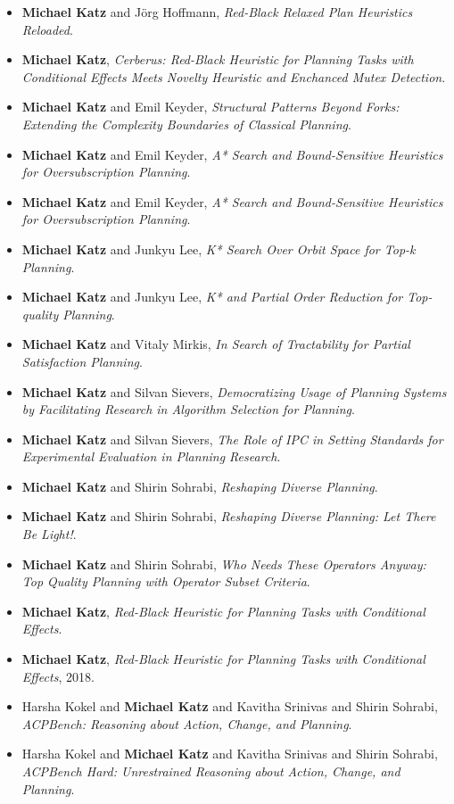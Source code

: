 \begin{itemize}[noitemsep]
\item {\bf Michael Katz} and Jörg Hoffmann, {\it Red-Black Relaxed Plan Heuristics Reloaded}.
\item {\bf Michael Katz}, {\it Cerberus: Red-Black Heuristic for Planning Tasks with Conditional Effects Meets Novelty Heuristic and Enchanced Mutex Detection}.
\item {\bf Michael Katz} and Emil Keyder, {\it Structural Patterns Beyond Forks: Extending the Complexity Boundaries of Classical Planning}.
\item {\bf Michael Katz} and Emil Keyder, {\it A* Search and Bound-Sensitive Heuristics for Oversubscription Planning}.
\item {\bf Michael Katz} and Emil Keyder, {\it A* Search and Bound-Sensitive Heuristics for Oversubscription Planning}.
\item {\bf Michael Katz} and Junkyu Lee, {\it K* Search Over Orbit Space for Top-k Planning}.
\item {\bf Michael Katz} and Junkyu Lee, {\it K* and Partial Order Reduction for Top-quality Planning}.
\item {\bf Michael Katz} and Vitaly Mirkis, {\it In Search of Tractability for Partial Satisfaction Planning}.
\item {\bf Michael Katz} and Silvan Sievers, {\it Democratizing Usage of Planning Systems by Facilitating Research in Algorithm Selection for Planning}.
\item {\bf Michael Katz} and Silvan Sievers, {\it The Role of IPC in Setting Standards for Experimental Evaluation in Planning Research}.
\item {\bf Michael Katz} and Shirin Sohrabi, {\it Reshaping Diverse Planning}.
\item {\bf Michael Katz} and Shirin Sohrabi, {\it Reshaping Diverse Planning: Let There Be Light!}.
\item {\bf Michael Katz} and Shirin Sohrabi, {\it Who Needs These Operators Anyway: Top Quality Planning with Operator Subset Criteria}.
\item {\bf Michael Katz}, {\it Red-Black Heuristic for Planning Tasks with Conditional Effects}.
\item {\bf Michael Katz}, {\it Red-Black Heuristic for Planning Tasks with Conditional Effects}, 2018.
\item Harsha Kokel and {\bf Michael Katz} and Kavitha Srinivas and Shirin Sohrabi, {\it ACPBench: Reasoning about Action, Change, and Planning}.
\item Harsha Kokel and {\bf Michael Katz} and Kavitha Srinivas and Shirin Sohrabi, {\it ACPBench Hard: Unrestrained Reasoning about Action, Change, and Planning}.

\end{itemize}
